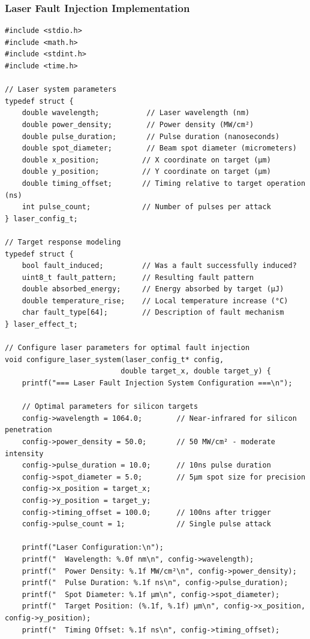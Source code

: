 \documentclass[12pt,a4paper]{article}
\begin{document}
\subsubsection{Laser Fault Injection Implementation}

\begin{lstlisting}[caption={Laser Fault Injection Control System}]
#include <stdio.h>
#include <math.h>
#include <stdint.h>
#include <time.h>

// Laser system parameters
typedef struct {
    double wavelength;           // Laser wavelength (nm)
    double power_density;        // Power density (MW/cm²)
    double pulse_duration;       // Pulse duration (nanoseconds)
    double spot_diameter;        // Beam spot diameter (micrometers)
    double x_position;          // X coordinate on target (μm)
    double y_position;          // Y coordinate on target (μm)
    double timing_offset;       // Timing relative to target operation (ns)
    int pulse_count;            // Number of pulses per attack
} laser_config_t;

// Target response modeling
typedef struct {
    bool fault_induced;         // Was a fault successfully induced?
    uint8_t fault_pattern;      // Resulting fault pattern
    double absorbed_energy;     // Energy absorbed by target (μJ)
    double temperature_rise;    // Local temperature increase (°C)
    char fault_type[64];        // Description of fault mechanism
} laser_effect_t;

// Configure laser parameters for optimal fault injection
void configure_laser_system(laser_config_t* config, 
                           double target_x, double target_y) {
    printf("=== Laser Fault Injection System Configuration ===\n");
    
    // Optimal parameters for silicon targets
    config->wavelength = 1064.0;        // Near-infrared for silicon penetration
    config->power_density = 50.0;       // 50 MW/cm² - moderate intensity
    config->pulse_duration = 10.0;      // 10ns pulse duration
    config->spot_diameter = 5.0;        // 5μm spot size for precision
    config->x_position = target_x;
    config->y_position = target_y;
    config->timing_offset = 100.0;      // 100ns after trigger
    config->pulse_count = 1;            // Single pulse attack
    
    printf("Laser Configuration:\n");
    printf("  Wavelength: %.0f nm\n", config->wavelength);
    printf("  Power Density: %.1f MW/cm²\n", config->power_density);
    printf("  Pulse Duration: %.1f ns\n", config->pulse_duration);
    printf("  Spot Diameter: %.1f μm\n", config->spot_diameter);
    printf("  Target Position: (%.1f, %.1f) μm\n", config->x_position, config->y_position);
    printf("  Timing Offset: %.1f ns\n", config->timing_offset);
    

\end{lstlisting}
\end{document}
